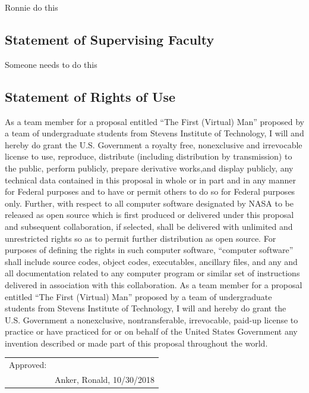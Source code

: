 \documentclass{article}
\let\Oldsubsection\subsection
\renewcommand{\subsection}{\FloatBarrier\Oldsubsection}
\begin{document}
Ronnie do this

\newpage

\subsection{Statement of Supervising Faculty}

Someone needs to do this

\newpage

\subsection{Statement of Rights of Use}

As a team member for a proposal entitled “The First (Virtual) Man” proposed by a team of undergraduate students from Stevens Institute of Technology, I will and hereby do grant the U.S. Government a royalty free, nonexclusive and irrevocable license to use, reproduce, distribute (including distribution by transmission) to the public, perform publicly, prepare derivative works,and display publicly, any technical data contained in this proposal in whole or in part and in any manner for Federal purposes and to have or permit others to do so for
Federal purposes only. Further, with respect to all computer software designated by
NASA to be released as open source which is first produced or delivered under this
proposal and subsequent collaboration, if selected, shall be delivered with unlimited and
unrestricted rights so as to permit further distribution as open source. For purposes of
defining the rights in such computer software, “computer software” shall include source
codes, object codes, executables, ancillary files, and any and all documentation related
to any computer program or similar set of instructions delivered in association with this
collaboration. As a team member for a proposal entitled “The First (Virtual) Man” proposed by a team of undergraduate students from Stevens Institute of Technology, I will and hereby do
grant the U.S. Government a nonexclusive, nontransferable, irrevocable, paid-up
license to practice or have practiced for or on behalf of the United States Government
any invention described or made part of this proposal throughout the world.

\bigskip
\bigskip
\bigskip

\begin{tabular}{@{}p{.5in}p{3.5in}@{}}
Approved: & \hrulefill \\
& Anker, Ronald, 10/30/2018\\
\end{tabular}
\end{document}
